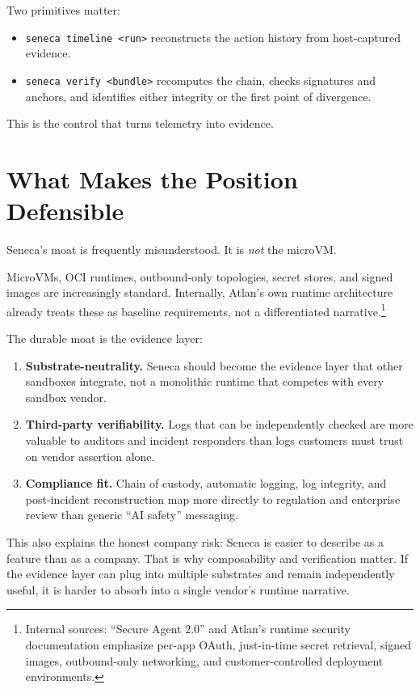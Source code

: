 \documentclass[11pt]{article}
\begin{document}
Two primitives matter:
\begin{itemize}[leftmargin=1.5em]
    \item \texttt{seneca timeline <run>} reconstructs the action history from host-captured evidence.
    \item \texttt{seneca verify <bundle>} recomputes the chain, checks signatures and anchors, and identifies either integrity or the first point of divergence.
\end{itemize}

This is the control that turns telemetry into evidence.

\section{What Makes the Position Defensible}

Seneca's moat is frequently misunderstood. It is \emph{not} the microVM.

MicroVMs, OCI runtimes, outbound-only topologies, secret stores, and signed images are increasingly standard. Internally, Atlan's own runtime architecture already treats these as baseline requirements, not a differentiated narrative.\footnote{Internal sources: ``Secure Agent 2.0'' and Atlan's runtime security documentation emphasize per-app OAuth, just-in-time secret retrieval, signed images, outbound-only networking, and customer-controlled deployment environments.}

The durable moat is the evidence layer:

\begin{enumerate}[leftmargin=1.5em]
    \item \textbf{Substrate-neutrality.} Seneca should become the evidence layer that other sandboxes integrate, not a monolithic runtime that competes with every sandbox vendor.
    \item \textbf{Third-party verifiability.} Logs that can be independently checked are more valuable to auditors and incident responders than logs customers must trust on vendor assertion alone.
    \item \textbf{Compliance fit.} Chain of custody, automatic logging, log integrity, and post-incident reconstruction map more directly to regulation and enterprise review than generic ``AI safety'' messaging.
\end{enumerate}

This also explains the honest company risk: Seneca is easier to describe as a feature than as a company. That is why composability and verification matter. If the evidence layer can plug into multiple substrates and remain independently useful, it is harder to absorb into a single vendor's runtime narrative.
\end{document}
